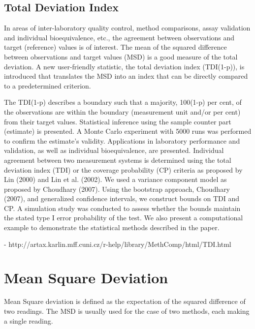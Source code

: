 \documentclass[MAIN.tex]{subfiles}
\begin{document}
\subsection*{Total Deviation Index}
In areas of inter-laboratory quality control, method comparisons, assay validation and individual bioequivalence, etc., the agreement between observations and target (reference) values is of interest. The mean of the squared difference between observations and target values (MSD) is a good measure of the total deviation. A new user-friendly statistic, the total deviation index (TDI(1-p)), is introduced that translates the MSD into an index that can be directly compared to a predetermined criterion. 

The TDI(1-p) describes a boundary such that a majority, 100(1-p) per cent, of the observations are within the boundary (measurement unit and/or per cent) from their target values. Statistical inference using the sample counter part (estimate) is presented. A Monte Carlo experiment with 5000 runs was performed to confirm the estimate's validity. Applications in laboratory performance and validation, as well as individual bioequivalence, are presented.
Individual agreement between two measurement systems is determined using the total deviation index (TDI) or the coverage probability (CP) criteria as proposed by Lin (2000) and Lin et al. (2002). We used a variance component model as proposed by Choudhary (2007). Using the bootstrap approach, Choudhary (2007), and generalized confidence intervals, we construct bounds on TDI and CP. A simulation study was conducted to assess whether the bounds maintain the stated type I error probability of the test. We also present a computational example to demonstrate the statistical methods described in the paper.

- http://artax.karlin.mff.cuni.cz/r-help/library/MethComp/html/TDI.html

\newpage
\section{Mean Square Deviation}
Mean Square deviation is defined as the expectation of the squared difference of two readings.
The MSD is usually used for the case of two methods, each making a single reading.
\end{document}
